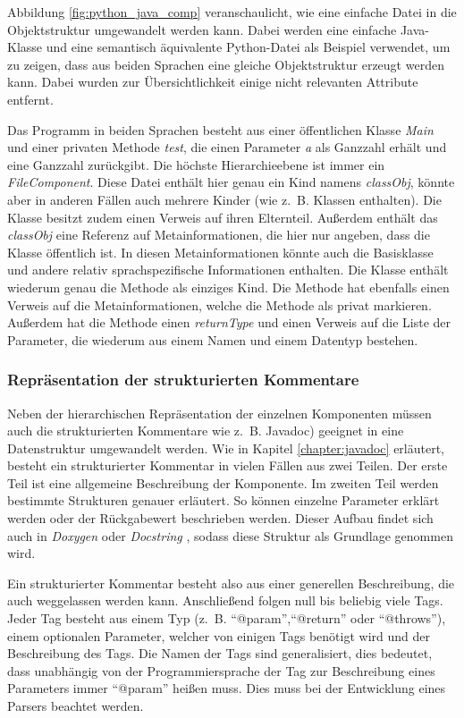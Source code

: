 Abbildung \ref{fig:python_java_comp} veranschaulicht, wie eine einfache Datei in die Objektstruktur umgewandelt werden kann. Dabei werden eine einfache Java-Klasse und eine semantisch äquivalente Python-Datei als Beispiel verwendet, um zu zeigen, dass aus beiden Sprachen eine gleiche Objektstruktur erzeugt werden kann. Dabei wurden zur Übersichtlichkeit einige nicht relevanten Attribute entfernt.

Das Programm in beiden Sprachen besteht aus einer öffentlichen Klasse \textit{Main} und einer privaten Methode \textit{test}, die einen Parameter \textit{a} als Ganzzahl erhält und eine Ganzzahl zurückgibt. Die höchste Hierarchieebene ist immer ein \textit{FileComponent}. Diese Datei enthält hier genau ein Kind namens \textit{classObj}, könnte aber in anderen Fällen auch mehrere Kinder (wie z.~B. Klassen enthalten). Die Klasse besitzt zudem einen Verweis auf ihren Elternteil. Außerdem enthält das \textit{classObj} eine Referenz auf Metainformationen, die hier nur angeben, dass die Klasse öffentlich ist. In diesen Metainformationen könnte auch die Basisklasse und andere relativ sprachspezifische Informationen enthalten. Die Klasse enthält wiederum genau die Methode als einziges Kind. Die Methode hat ebenfalls einen Verweis auf die Metainformationen, welche die Methode als privat markieren. Außerdem hat die Methode einen \textit{returnType} und einen Verweis auf die Liste der Parameter, die wiederum aus einem Namen und einem Datentyp bestehen.

\subsubsection{Repräsentation der strukturierten Kommentare}\label{chapter:structured_comments}
Neben der hierarchischen Repräsentation der einzelnen Komponenten müssen auch die strukturierten Kommentare wie z.~B. Javadoc) geeignet in eine Datenstruktur umgewandelt werden. Wie in Kapitel \ref{chapter:javadoc}
 erläutert, besteht ein strukturierter Kommentar in vielen Fällen aus zwei Teilen. Der erste Teil ist eine allgemeine Beschreibung der Komponente. Im zweiten Teil werden bestimmte Strukturen genauer erläutert. So können einzelne Parameter erklärt werden oder der Rückgabewert beschrieben werden. 
 Dieser Aufbau findet sich auch in \textit{Doxygen} \cite{doxygen} oder \textit{Docstring} \cite{docstring}, sodass diese Struktur als Grundlage genommen wird. 
 
 Ein strukturierter Kommentar besteht also aus einer generellen Beschreibung, die auch weggelassen werden kann. Anschließend folgen null bis beliebig viele Tags. Jeder Tag besteht aus einem Typ (z.~B. \enquote{@param},\enquote{@return} oder \enquote{@throws}), einem optionalen Parameter, welcher von einigen Tags benötigt wird und der Beschreibung des Tags. Die Namen der Tags sind generalisiert, dies bedeutet, dass unabhängig von der Programmiersprache der Tag zur Beschreibung eines Parameters immer \enquote{@param} heißen muss. Dies muss bei der Entwicklung eines Parsers beachtet werden. 
 
